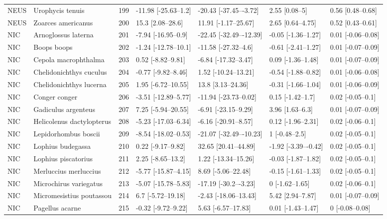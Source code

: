 \begin{longtable}[t]{lllllll}
NEUS & Urophycis tenuis & 199 & -11.98 [-25.63–1.2] & -20.43 [-37.45–-3.72] & 2.55 [0.08–5] & 0.56 [0.48–0.68]\\
NEUS & Zoarces americanus & 200 & 15.3 [2.08–28.6] & 11.91 [-1.17–25.67] & 2.65 [0.64–4.75] & 0.52 [0.43–0.61]\\
\addlinespace
NIC & Arnoglossus laterna & 201 & -7.94 [-16.95–0.9] & -22.45 [-32.49–-12.39] & -0.05 [-1.36–1.27] & 0.01 [-0.06–0.08]\\
NIC & Boops boops & 202 & -1.24 [-12.78–10.1] & -11.58 [-27.32–4.6] & -0.61 [-2.41–1.27] & 0.01 [-0.07–0.09]\\
NIC & Cepola macrophthalma & 203 & 0.52 [-8.82–9.81] & -6.84 [-17.32–3.47] & 0.09 [-1.36–1.48] & 0.01 [-0.07–0.09]\\
NIC & Chelidonichthys cuculus & 204 & -0.77 [-9.82–8.46] & 1.52 [-10.24–13.21] & -0.54 [-1.88–0.82] & 0.01 [-0.06–0.08]\\
NIC & Chelidonichthys lucerna & 205 & 1.95 [-6.72–10.55] & 13.8 [3.13–24.36] & -0.31 [-1.66–1.04] & 0.01 [-0.06–0.09]\\
\addlinespace
NIC & Conger conger & 206 & -3.51 [-12.89–5.77] & -11.94 [-23.73–0.02] & 0.15 [-1.42–1.7] & 0.02 [-0.05–0.1]\\
NIC & Gadiculus argenteus & 207 & 7.25 [-5.94–20.55] & -6.91 [-23.15–9.29] & 3.96 [1.63–6.3] & 0.01 [-0.07–0.09]\\
NIC & Helicolenus dactylopterus & 208 & -5.23 [-17.03–6.34] & -6.16 [-20.91–8.57] & 0.12 [-1.96–2.31] & 0.02 [-0.06–0.1]\\
NIC & Lepidorhombus boscii & 209 & -8.54 [-18.02–0.53] & -21.07 [-32.49–-10.23] & 1 [-0.48–2.5] & 0.02 [-0.05–0.1]\\
NIC & Lophius budegassa & 210 & 0.22 [-9.17–9.82] & 32.65 [20.41–44.89] & -1.92 [-3.39–-0.42] & 0.02 [-0.05–0.1]\\
\addlinespace
NIC & Lophius piscatorius & 211 & 2.25 [-8.65–13.2] & 1.22 [-13.34–15.26] & -0.03 [-1.87–1.82] & 0.02 [-0.05–0.1]\\
NIC & Merluccius merluccius & 212 & -5.77 [-15.87–4.15] & 8.69 [-5.06–22.48] & -0.15 [-1.61–1.33] & 0.02 [-0.05–0.1]\\
NIC & Microchirus variegatus & 213 & -5.07 [-15.78–5.83] & -17.19 [-30.2–-3.23] & 0 [-1.62–1.65] & 0.02 [-0.06–0.1]\\
NIC & Micromesistius poutassou & 214 & 6.7 [-5.72–19.18] & -2.43 [-18.06–13.43] & 5.42 [2.94–7.87] & 0.01 [-0.07–0.09]\\
NIC & Pagellus acarne & 215 & -0.32 [-9.72–9.22] & 5.63 [-6.57–17.83] & 0.01 [-1.43–1.47] & 0 [-0.08–0.08]\\

\end{longtable}
